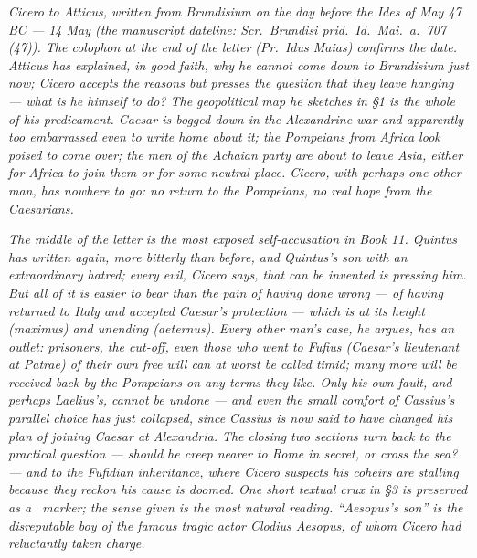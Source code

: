 
\textit{Cicero to Atticus, written from Brundisium on
the day before the Ides of May 47 BC --- 14 May (the
manuscript dateline: \textit{Scr.\ Brundisi prid.\
Id.\ Mai.\ a.\ 707 (47)}). The colophon at the end
of the letter (\textit{Pr.\ Idus Maias}) confirms the
date. Atticus has explained, in good faith, why he
cannot come down to Brundisium just now; Cicero
accepts the reasons but presses the question that
they leave hanging --- what is he himself to do? The
geopolitical map he sketches in \S1 is the whole of
his predicament. Caesar is bogged down in the
Alexandrine war and apparently too embarrassed even
to write home about it; the Pompeians from Africa
look poised to come over; the men of the Achaian
party are about to leave Asia, either for Africa to
join them or for some neutral place. Cicero, with
perhaps one other man, has nowhere to go: no return
to the Pompeians, no real hope from the Caesarians.}

\textit{The middle of the letter is the most exposed
self-accusation in Book 11. Quintus has written
again, more bitterly than before, and Quintus's son
with an extraordinary hatred; every evil, Cicero
says, that can be invented is pressing him. But all
of it is easier to bear than the pain of having
done wrong --- of having returned to Italy and
accepted Caesar's protection --- which is at its
height (\textit{maximus}) and unending
(\textit{aeternus}). Every other man's case, he
argues, has an outlet: prisoners, the cut-off, even
those who went to Fufius (Caesar's lieutenant at
Patrae) of their own free will can at worst be
called timid; many more will be received back by
the Pompeians on any terms they like. Only his own
fault, and perhaps Laelius's, cannot be undone ---
and even the small comfort of Cassius's parallel
choice has just collapsed, since Cassius is now
said to have changed his plan of joining Caesar at
Alexandria. The closing two sections turn back to
the practical question --- should he creep nearer
to Rome in secret, or cross the sea? --- and to the
Fufidian inheritance, where Cicero suspects his
coheirs are stalling because they reckon his cause
is doomed. One short textual crux in \S3 is
preserved as a \dag\ marker; the sense given is the
most natural reading. ``Aesopus's son'' is the
disreputable boy of the famous tragic actor Clodius
Aesopus, of whom Cicero had reluctantly taken
charge.}
